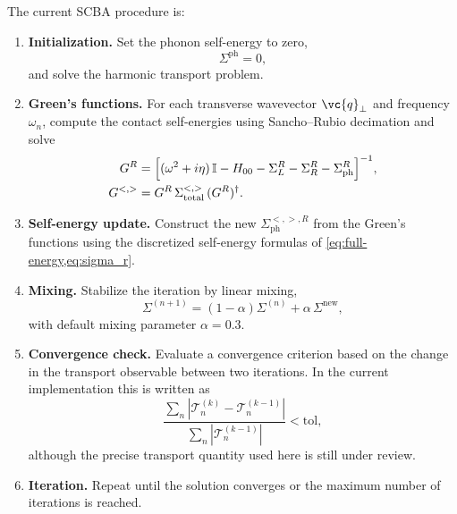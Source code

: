 The current SCBA procedure is:
\begin{enumerate}
  \item \textbf{Initialization.}
        Set the phonon self-energy to zero,
        \begin{equation}
          \Sigma^\mathrm{ph} = 0,
        \end{equation}
        and solve the harmonic transport problem.

  \item \textbf{Green's functions.}
        For each transverse wavevector $\vc{q}_\perp$ and frequency
        $\omega_n$, compute the contact self-energies using
        Sancho--Rubio decimation and solve
        \begin{align}
          G^R
          &= \Bigl[
               (\omega^2+i\eta)\,\mathbb{I}
               - H_{00}
               - \Sigma_L^R
               - \Sigma_R^R
               - \Sigma_\mathrm{ph}^R
             \Bigr]^{-1}, \\
          G^{<,>}
          &= G^R\,
             \Sigma^{<,>}_\mathrm{total}\,
             (G^R)^\dagger.
        \end{align}

  \item \textbf{Self-energy update.}
        Construct the new
        $\Sigma_\mathrm{ph}^{<,>,R}$ from the Green's functions using
        the discretized self-energy formulas of
        \cref{eq:full-energy,eq:sigma_r}.

  \item \textbf{Mixing.}
        Stabilize the iteration by linear mixing,
        \begin{equation}
          \Sigma^{(n+1)}
          = (1-\alpha)\Sigma^{(n)}
            + \alpha\,\Sigma^\mathrm{new},
        \end{equation}
        with default mixing parameter $\alpha=0.3$.

  \item \textbf{Convergence check.}
        Evaluate a convergence criterion based on the change in the
        transport observable between two iterations.  In the current
        implementation this is written as
        \begin{equation}
          \frac{\sum_n
            |\mathcal{T}^{(k)}_n-\mathcal{T}^{(k-1)}_n|}
               {\sum_n |\mathcal{T}^{(k-1)}_n|}
          < \mathrm{tol},
        \end{equation}
        although the precise transport quantity used here is still under
        review.

  \item \textbf{Iteration.}
        Repeat until the solution converges or the maximum number of
        iterations is reached.
\end{enumerate}

